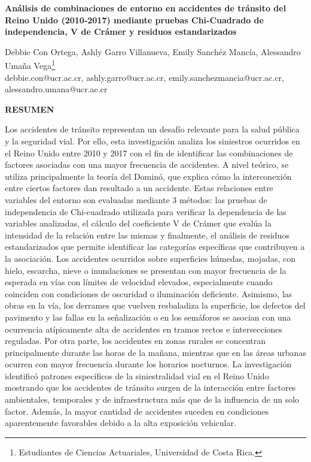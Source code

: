 \documentclass[11pt]{article}
\newcommand{\seccion}[1]{%
  \vspace{1.2em}
  \begin{center}\textbf{#1}\end{center}
  \vspace{0.3em}
}
\begin{document}
\begin{center}
\textbf{Análisis de combinaciones de entorno en accidentes de tránsito del Reino Unido (2010-2017) mediante pruebas Chi-Cuadrado de independencia, V de Crámer y residuos estandarizados}
\end{center}

\vspace{0.5em}
\noindent Debbie Con Ortega, Ashly Garro Villanueva, Emily Sanchéz Mancía, Alessandro Umaña Vega\footnote{Estudiantes de Ciencias Actuariales, Universidad de Costa Rica.}\\
debbie.con@ucr.ac.cr, ashly.garro@ucr.ac.cr, emily.sanchezmancia@ucr.ac.cr, alessandro.umana@ucr.ac.cr


\seccion{RESUMEN}

Los accidentes de tránsito representan un desafío relevante para la salud pública 
  y la seguridad vial. Por ello, esta investigación analiza los siniestros ocurridos 
  en el Reino Unido entre 2010 y 2017 con el fin de identificar las combinaciones 
  de factores asociadas con una mayor frecuencia de accidentes. A nivel teórico, 
  se utiliza principalmente la teoría del Dominó, que explica cómo la interconexión 
  entre ciertos factores dan resultado a un accidente. Estas relaciones entre 
  variables del entorno son evaluadas mediante 3 métodos: las pruebas de independencia 
  de Chi-cuadrado utilizada para verificar la dependencia de las variables analizadas, 
  el cálculo del coeficiente V de Crámer que evalúa la intensidad de la relación
  entre las mismas y finalmente, el análisis de residuos estandarizados que permite 
  identificar las categorías específicas que contribuyen a la asociación. Los accidentes 
  ocurridos sobre superficies húmedas, mojadas, con hielo, escarcha, nieve o inundaciones 
  se presentan con mayor frecuencia de la esperada en vías con límites de velocidad 
  elevados, especialmente cuando coinciden con condiciones de oscuridad o iluminación 
  deficiente. Asimismo, las obras en la vía, los derrames que vuelven resbaladiza 
  la superficie, los defectos del pavimento y las fallas en la señalización o en 
  los semáforos se asocian con una ocurrencia atípicamente alta de accidentes en 
  tramos rectos e intersecciones reguladas. Por otra parte, los accidentes en zonas
  rurales se concentran principalmente durante las horas de la mañana, mientras que 
  en las áreas urbanas ocurren con mayor frecuencia durante los horarios nocturnos. 
  La investigación identificó patrones específicos de la siniestralidad vial en el
  Reino Unido mostrando que los accidentes de tránsito surgen de la interacción 
  entre factores ambientales, temporales y de infraestructura más que de la influencia 
  de un solo factor. Además, la mayor cantidad de accidentes suceden en condiciones 
  aparentemente favorables debido a la alta exposición vehicular.\\
\end{document}
